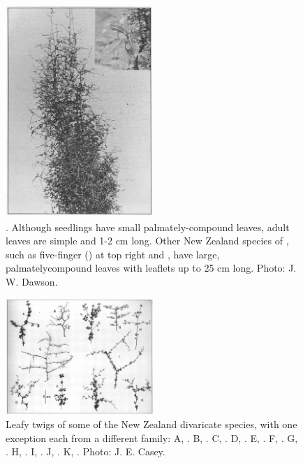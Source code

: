 \begin{figure}
	\includegraphics[width=0.5\textwidth]{graphics/figure76pseudopanax.jpg}
	\centering
	\caption[Pseudopanax anomalus]{.
    Although seedlings have small palmately-compound leaves, adult leaves are simple and 1-2 cm long.
    Other New Zealand species of , such as five-finger () at top right and , have large, palmatelycompound leaves with leaflets up to 25 cm long. Photo:  J. W. Dawson.}
	\label{fig:76pseudopanax}
\end{figure}

\begin{figure}
	\includegraphics[width=0.5\textwidth]{graphics/figure77twigs.jpg}
	\centering
	\caption[Leafy twigs of some of the New Zealand divaricate species]{Leafy twigs of some of the New Zealand divaricate species, with one exception each from a different family: A, .
    B, .
    C, .
    D, .
    E, .
    F, .
    G, .
    H, .
    I, .
    J, .
    K, .
    Photo:  J. E. Casey.}
	\label{fig:77twigs}
\end{figure}

